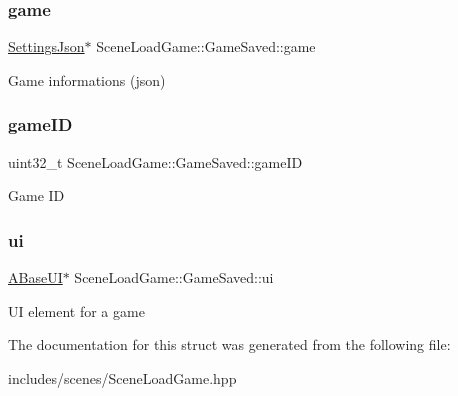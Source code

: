 \subsubsection{\texorpdfstring{game}{game}}
{\footnotesize\ttfamily \hyperlink{class_settings_json}{Settings\+Json}$\ast$ Scene\+Load\+Game\+::\+Game\+Saved\+::game}

Game informations (json) \mbox{\label{struct_scene_load_game_1_1_game_saved_ae8ad0057c09060413b282e4d111fcc4c}} 
\subsubsection{\texorpdfstring{game\+ID}{gameID}}
{\footnotesize\ttfamily uint32\+\_\+t Scene\+Load\+Game\+::\+Game\+Saved\+::game\+ID}

Game ID \mbox{\label{struct_scene_load_game_1_1_game_saved_aa837cefcef8df2d154023aceddf7d3a3}} 
\subsubsection{\texorpdfstring{ui}{ui}}
{\footnotesize\ttfamily \hyperlink{class_a_base_u_i}{A\+Base\+UI}$\ast$ Scene\+Load\+Game\+::\+Game\+Saved\+::ui}

UI element for a game 

The documentation for this struct was generated from the following file\+:\begin{DoxyCompactItemize}
\item 
includes/scenes/Scene\+Load\+Game.\+hpp\end{DoxyCompactItemize}
